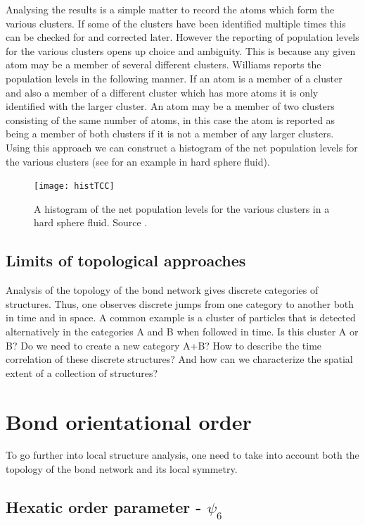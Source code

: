 Analysing the results is a simple matter to record the atoms which form the various clusters. If some of the clusters have been identified multiple times this can be checked for and corrected later. However the reporting of population levels for the various clusters opens up choice and ambiguity. This is because any given atom may be a member of several different clusters. Williams reports the population levels in the following manner. If an atom is a member of a cluster and also a member of a different cluster which has more atoms it is only identified with the larger cluster. An atom may be a member of two clusters consisting of the same number of atoms, in this case the atom is reported as being a member of both clusters if it is not a member of any larger clusters. Using this approach we can construct a histogram of the net population levels for the various clusters (see  for an example in hard sphere fluid).

\begin{figure}
	\centering
	\texttt{[image: histTCC]}
	\caption{A histogram of the net population levels for the various clusters in a hard sphere fluid. Source .}
	\label{fig:tcc}
\end{figure}

\subsection{Limits of topological approaches}

Analysis of the topology of the bond network gives discrete categories of structures. Thus, one observes discrete jumps from one category to another both in time and in space. A common example is a cluster of particles that is detected alternatively in the categories A and B when followed in time. Is this cluster A or B? Do we need to create a new category A+B? How to describe the time correlation of these discrete structures? And how can we characterize the spatial extent of a collection of structures?

\section{Bond orientational order}
\label{sec:boo}

To go further into local structure analysis, one need to take into account both the topology of the bond network and its local symmetry.

\subsection{Hexatic order parameter - \texorpdfstring{$\psi_6$}{psi6}}

